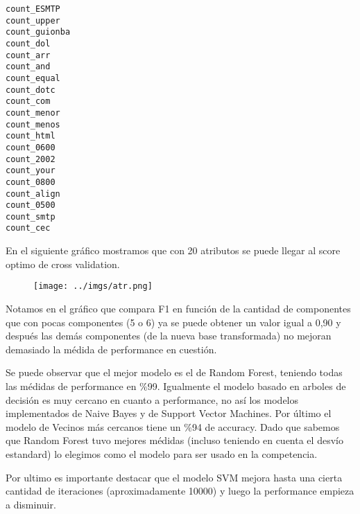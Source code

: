 \documentclass[10pt, a4paper]{article}
\begin{document}
\begin{description}
\item [\texttt{count\_ESMTP}]
\item [\texttt{count\_upper}]
\item [\texttt{count\_guionba}]
\item [\texttt{count\_dol}]
\item [\texttt{count\_arr}]
\item [\texttt{count\_and}]
\item [\texttt{count\_equal}]
\item [\texttt{count\_dotc}]
\item [\texttt{count\_com}]
\item [\texttt{count\_menor}]
\item [\texttt{count\_menos}]
\item [\texttt{count\_html}]
\item [\texttt{count\_0600}]
\item [\texttt{count\_2002}]
\item [\texttt{count\_your}]
\item [\texttt{count\_0800}]
\item [\texttt{count\_align}]
\item [\texttt{count\_0500}]
\item [\texttt{count\_smtp}]
\item [\texttt{count\_cec}]
\end{description}


En el siguiente gráfico mostramos que con 20 atributos se puede llegar al score optimo de cross validation.
\begin{figure}[H]
\centering
\texttt{[image: ../imgs/atr.png]}
\end{figure}



Notamos en el gráfico que compara F1 en función de la cantidad de componentes que con pocas componentes (5 o 6) ya se puede obtener un valor igual a 0,90 y después las demás componentes (de la nueva base transformada) no mejoran demasiado la médida de performance en cuestión.

Se puede observar que el mejor modelo es el de Random Forest, teniendo todas las médidas de performance en \%99. Igualmente el modelo basado en arboles de decisión es muy cercano en cuanto a performance, no así los modelos implementados de Naive Bayes y de Support Vector Machines. Por último el modelo de Vecinos más cercanos tiene un \%94 de accuracy. Dado que sabemos que Random Forest tuvo mejores médidas (incluso teniendo en cuenta el desvío estandard) lo elegimos como el modelo para ser usado en la competencia.

Por ultimo es importante destacar que el modelo SVM mejora hasta una cierta cantidad de iteraciones (aproximadamente 10000) y luego la performance empieza a disminuir.
\end{document}
